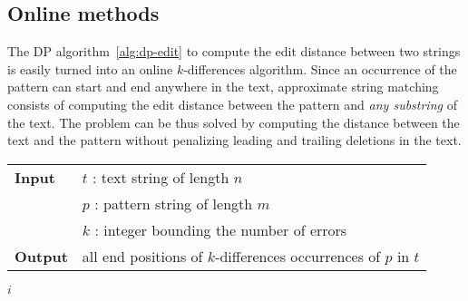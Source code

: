 
\subsection{Online methods}
\label{sub:introonline}



The DP algorithm~\ref{alg:dp-edit} to compute the edit distance between two strings is easily turned into an online $k$-differences algorithm.
Since an occurrence of the pattern can start and end anywhere in the text, approximate string matching consists of computing the edit distance between the pattern and \emph{any substring} of the text.
The problem can be thus solved by computing the distance between the text and the pattern without penalizing leading and trailing deletions in the text.

\begin{figure*}[h]
\begin{center}
\begin{minipage}[t]{.9\textwidth}
\begin{algorithm}[H]
\begin{tabular}{ll}
\textbf{Input}  & $t$ : text string of length $n$\\
				& $p$ : pattern string of length $m$\\
				& $k$ : integer bounding the number of errors\\
\textbf{Output} & all end positions of $k$-differences occurrences of $p$ in $t$\\
\end{tabular}
\begin{algorithmic}[1]
\EndFor
{}
	\EndFor
		\State \Report $i$
	\EndIf
\EndFor
\end{algorithmic}
\label{alg:dp-kdiff}
\end{algorithm}
\end{minipage}
\end{center}
\end{figure*}

